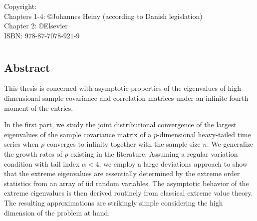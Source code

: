 \vspace*{5cm}
\noindent \hspace*{0.5cm} Copyright:\\
\hspace*{0.5cm} Chapters 1-4: \copyright Johannes Heiny (according to Danish legislation)\\
\hspace*{0.5cm} Chapter 2: \copyright Elsevier\\

\noindent \hspace*{0.5cm} ISBN: $978$-$87$-$7078$-$921$-$9$

\begin{comment}
{	\pagestyle{empty}
	\setlength{\topmargin}{0pt}
	\setlength{\headheight}{0pt}
	\setlength{\headsep}{0pt}
	\setlength{\footskip}{0pt}
	
	\setlength{\parskip}{12pt}	
	
 \large \textbf{\textsc{Johannes Heiny}}
		
		\vspace*{1cm}
		
	
	\vspace*{\fill}}
\end{comment}


\chapter*{}
\vspace*{-2cm}
\section*{Abstract}

This thesis is concerned with asymptotic properties of the eigenvalues of high-dimensional sample covariance and correlation matrices under an infinite fourth moment of the entries.

In the first part, we study the joint distributional convergence of the largest eigenvalues of the sample covariance matrix of a $p$-dimensional heavy-tailed time series when $p$ converges to infinity together with the sample size $n$. We generalize the growth rates of $p$ existing in the literature. Assuming a regular variation condition with tail index $\alpha<4$, we employ a large deviations approach to show that the extreme eigenvalues are essentially determined by the extreme order statistics from an array of iid random variables.  The asymptotic behavior of the extreme eigenvalues is then derived routinely from classical extreme value theory. The resulting approximations are strikingly simple considering the high dimension of the problem at hand.

